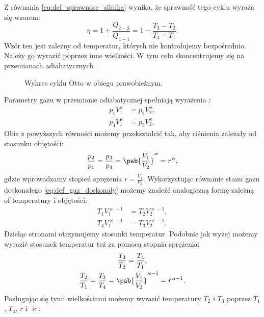 Z równania \eqref{eq:def_sprawnosc_silnika} wynika, że sprawność tego cyklu wyraża się wzorem:
\begin{equation}
	\eta = 1 + \frac{Q_{2-3}}{Q_{4-1}} = 1 - \frac{T_3 - T_2}{T_4 - T_1}.
\end{equation}
Wzór ten jest zależny od temperatur, których nie kontrolujemy bezpośrednio. Należy go wyrazić poprzez inne wielkości. W tym celu skoncentrujemy się na przemianach adiabatycznych.

\begin{figure}
	\centering
	
	\caption{Wykres cyklu Otto w obiegu prawobieżnym.}
	\label{fig:pv_silnik_otto}
\end{figure}

Parametry gazu w przemianie adiabatycznej spełniają wyrażenia \cite{b:pudlik_termodynamika}:
\begin{equation}
\begin{split}
	p_{1}V_{1}^{\varkappa} &= p_{2}V_{2}^{\varkappa}, \\
	p_{4}V_{1}^{\varkappa} &= p_{3}V_{2}^{\varkappa}.
\end{split}
\end{equation}
Obie z powyższych równości możemy przekształcić tak, aby ciśnienia zależały od stosunku objętości:
\begin{equation}
	\frac{p_2}{p_1} = \frac{p_3}{p_4} = \pab{\frac{V_1}{V_2}}^{\varkappa} = r^{\varkappa},
\end{equation}
gdzie wprowadzamy stopień sprężenia \(r = \frac{V_1}{V_2}\). Wykorzystując równanie stanu gazu doskonałego \eqref{eq:def_gaz_doskonaly} możemy znaleźć analogiczną formę zależną of temperatury i objętości:
\begin{equation}
\begin{split}
	T_{1}V_{1}^{\varkappa-1} &= T_{2}V_{2}^{\varkappa-1}, \\
	T_{4}V_{1}^{\varkappa-1} &= T_{3}V_{2}^{\varkappa-1}.
\end{split}
\end{equation}
Dzieląc stronami otrzymujemy stosunki temperatur. Podobnie jak wyżej możemy wyrazić stosunek temperatur też za pomocą stopnia sprężenia:
\begin{gather}
	\frac{T_3}{T_2} = \frac{T_4}{T_1}, \\
	\frac{T_2}{T_1} = \frac{T_3}{T_4} = \pab{\frac{V_1}{V_2}}^{\varkappa-1} = r^{\varkappa-1} \label{eq:otto_stosunek_T}.
\end{gather}
Posługując się tymi wielkościami możemy wyrazić temperatury \(T_2\) i \(T_3\) poprzez \(T_1\), \(T_4\), \(r\) i \(\varkappa\):
